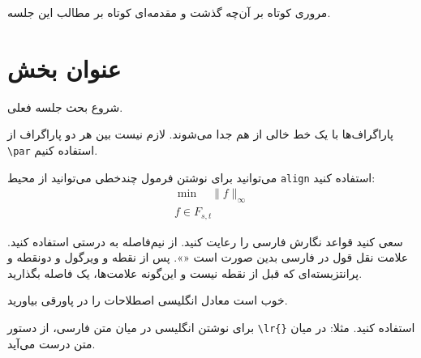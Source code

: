 \documentclass[11pt]{article}
\begin{document}





مروری کوتاه بر آن‌چه گذشت و مقدمه‌ای کوتاه بر مطالب این جلسه. 




\section{عنوان بخش}
شروع بحث جلسه فعلی. 

پاراگراف‌ها با یک خط خالی از هم جدا می‌شوند. لازم نیست بین هر دو پاراگراف از \verb|\par|  استفاده کنیم.

می‌توانید برای نوشتن فرمول چندخطی می‌توانید از محیط \verb|align| استفاده کنید:
\begin{align*} 
\min \quad \| f \|_{\infty}\\ 
f \in F_{s,t} 
\end{align*}

سعی کنید قواعد نگارش فارسی را رعایت کنید. از نیم‌فاصله
به درستی استفاده کنید. علامت نقل قول در فارسی بدین صورت است «». پس از نقطه و ویرگول و دونقطه و پرانتزبسته‌ای که قبل از نقطه نیست و این‌گونه علامت‌ها، یک فاصله بگذارید.

خوب است معادل انگلیسی اصطلاحات را در پاورقی%
بیاورید.

برای نوشتن انگلیسی در میان متن فارسی، از دستور \verb+\lr{}+ استفاده کنید. 
مثلا:
در میان متن درست می‌آید.
\end{document}
